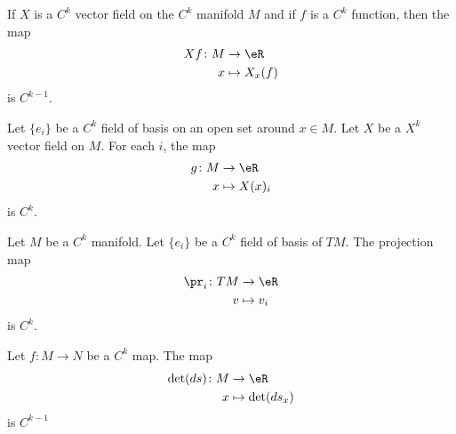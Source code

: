 \begin{lemma}       \label{LEMooPSWEooVKLWMQ}
	If \( X\) is a \( C^k\) vector field on the \( C^k\) manifold \( M\) and if \( f\) is a \( C^k\) function, then the map
	\begin{equation}
		\begin{aligned}
			Xf\colon M & \to \eR        \\
			x          & \mapsto X_x(f)
		\end{aligned}
	\end{equation}
	is \( C^{k-1}\).
\end{lemma}

\begin{proposition}		\label{PROPooVZNUooVoyFnx}
	Let \( \{ e_i \}\) be a \( C^k\) field of basis on an open set around \( x\in M\). Let \( X\) be a \( X^k\) vector field on \( M\). For each \( i\), the map
	\begin{equation}
		\begin{aligned}
			g\colon M & \to \eR        \\
			x         & \mapsto X(x)_i
		\end{aligned}
	\end{equation}
	is \( C^k\).
\end{proposition}

\begin{proposition}		\label{PROPooLAQTooRHYmqy}
	Let \( M\) be a \( C^k\) manifold. Let \( \{ e_i \}\) be a \( C^k\) field of basis of \( TM\). The projection map
	\begin{equation}
		\begin{aligned}
			\pr_i\colon TM & \to \eR     \\
			v              & \mapsto v_i
		\end{aligned}
	\end{equation}
	is \( C^k\).
\end{proposition}


\begin{proposition}		\label{PROPooYPLLooZaQEMx}
	Let \(f \colon M\to N  \) be a \( C^k\) map. The map
	\begin{equation}
		\begin{aligned}
			\det(ds)\colon M & \to \eR            \\
			x                & \mapsto \det(ds_x)
		\end{aligned}
	\end{equation}
	is \( C^{k-1}\)
\end{proposition}



